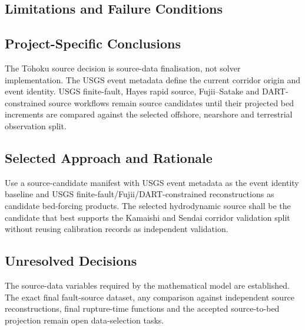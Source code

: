 
\subsection{Limitations and Failure Conditions}
\label{sec:res-dat-src-limitations}


\subsection{Project-Specific Conclusions}
\label{sec:res-dat-src-conclusions}

The Tōhoku source decision is source-data finalisation, not solver
implementation. The USGS event metadata define the current corridor
origin and event identity. USGS finite-fault, Hayes rapid source,
Fujii--Satake and DART-constrained source workflows remain source
candidates until their projected bed increments are compared against
the selected offshore, nearshore and terrestrial observation split.

\subsection{Selected Approach and Rationale}
\label{sec:res-dat-src-selected-approach}

Use a source-candidate manifest with USGS event metadata as the event
identity baseline and USGS finite-fault/Fujii/DART-constrained
reconstructions as candidate bed-forcing products. The selected
hydrodynamic source shall be the candidate that best supports the
Kamaishi and Sendai corridor validation split without reusing
calibration records as independent validation.

\subsection{Unresolved Decisions}
\label{sec:res-dat-src-unresolved-decisions}


The source-data variables required by the mathematical model are
established. The exact final fault-source dataset, any comparison
against independent source reconstructions, final rupture-time
functions and the accepted source-to-bed projection remain open
data-selection tasks.

